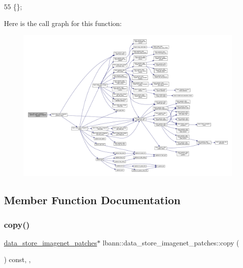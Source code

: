 \begin{DoxyCode}
55 \{\};
\end{DoxyCode}
Here is the call graph for this function\+:\nopagebreak
\begin{figure}[H]
\begin{center}
\leavevmode
\includegraphics[width=350pt]{classlbann_1_1data__store__imagenet__patches_ac4b8e5f893a4eccdeceee9c872a4b5b9_cgraph}
\end{center}
\end{figure}


\subsection{Member Function Documentation}
\mbox{\label{classlbann_1_1data__store__imagenet__patches_a5067e8299f5cf073497a5005ee9db759}} 
\subsubsection{\texorpdfstring{copy()}{copy()}}
{\footnotesize\ttfamily \hyperlink{classlbann_1_1data__store__imagenet__patches}{data\+\_\+store\+\_\+imagenet\+\_\+patches}$\ast$ lbann\+::data\+\_\+store\+\_\+imagenet\+\_\+patches\+::copy (\begin{DoxyParamCaption}{ }\end{DoxyParamCaption}) const\hspace{0.3cm}{\ttfamily [inline]}, {\ttfamily [override]}, {\ttfamily [virtual]}}



